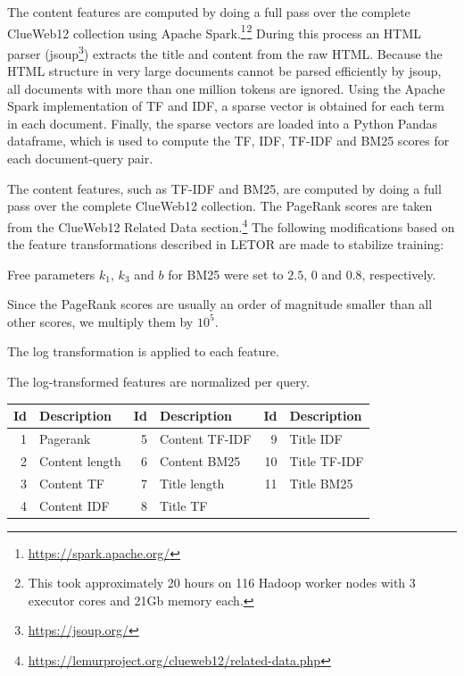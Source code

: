 The content features are computed by doing a full pass over the complete ClueWeb12 collection using Apache Spark.\footnote{\url{https://spark.apache.org/}}$^{ }$\footnote{This took approximately 20 hours on 116 Hadoop worker nodes with 3 executor cores and 21Gb memory each.}
During this process an HTML parser (jsoup\footnote{\url{https://jsoup.org/}}) extracts the title and content from the raw HTML.
Because the HTML structure in very large documents cannot be parsed efficiently by jsoup, all documents with more than one million tokens are ignored.
Using the Apache Spark implementation of TF and IDF, a sparse vector is obtained for each term in each document. Finally, the sparse vectors are loaded into a Python Pandas dataframe, which is used to compute the TF, IDF, TF-IDF and BM25 scores for each document-query pair.
\fi

The content features, such as TF-IDF and BM25, are computed by doing a full pass over the complete ClueWeb12 collection.
The PageRank scores are taken from the ClueWeb12 Related Data section.\footnote{\url{https://lemurproject.org/clueweb12/related-data.php}}
The following modifications based on the feature transformations described in LETOR are made to stabilize training:
\begin{inparaenum}[(1)]%
\item Free parameters $k_1$, $k_3$ and $b$ for BM25 were set to $2.5$, $0$ and $0.8$, respectively. 
\item Since the PageRank scores are usually an order of magnitude smaller than all other scores, we multiply them by $10^5$.
\item The log transformation is applied to each feature.
\item The log-transformed features are normalized per query.  
\end{inparaenum}

\begin{table}[h]
\centering
{}  \label{tab:setdescription} 
\begin{tabular}{rlrlrl}
\toprule
Id & Description & Id & Description & Id & Description    \\ 
\midrule
1  & Pagerank  & 5  & Content TF-IDF  & 9  & Title IDF   \\
2  & Content length & 6  & Content BM25   & 10 & Title TF-IDF   \\
3  & Content TF  & 7  & Title length & 11 & Title BM25  \\
4  & Content IDF & 8  & Title TF  & & \\
\bottomrule
\end{tabular}
\end{table}

